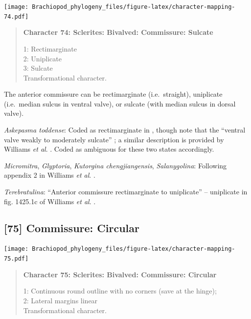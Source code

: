 \documentclass[openany]{book}
\begin{document}
\texttt{[image: Brachiopod\_phylogeny\_files/figure-latex/character-mapping-74.pdf]}

\begin{quote}
\textbf{Character 74: Sclerites: Bivalved: Commissure: Sulcate}

1: Rectimarginate\\
2: Uniplicate\\
3: Sulcate\\
Transformational character.
\end{quote}

The anterior commissure can be rectimarginate (i.e.~straight),
uniplicate (i.e.~median sulcus in ventral valve), or sulcate (with
median sulcus in dorsal valve).

\hypertarget{Askepasma_toddense-coding-74}{}
\emph{Askepasma toddense}: Coded as rectimarginate in
\citet{Williams1998Thediversity}, though note that the ``ventral valve
weakly to moderately sulcate'' \citep{Topper2013Theoldest}; a similar
description is provided by Williams \emph{et al}.
\citeyearpar{Williams2000LinguliformeaCraniiformea}. Coded as ambiguous
for these two states accordingly.

\hypertarget{Glyptoria-coding-74}{}
\emph{Micromitra}, \emph{Glyptoria}, \emph{Kutorgina chengjiangensis},
\emph{Salanygolina}: Following appendix 2 in Williams \emph{et al}.
\citeyearpar{Williams1998Thediversity}.

\hypertarget{Terebratulina-coding-74}{}
\emph{Terebratulina}: ``Anterior commissure rectimarginate to
uniplicate'' -- uniplicate in fig. 1425.1c of Williams \emph{et al}.
\citeyearpar{Williams2006Rhynchonelliformeapart}.

\subsection*{{[}75{]} Commissure: Circular}\label{commissure-circular}

\texttt{[image: Brachiopod\_phylogeny\_files/figure-latex/character-mapping-75.pdf]}

\begin{quote}
\textbf{Character 75: Sclerites: Bivalved: Commissure: Circular}

1: Continuous round outline with no corners (save at the hinge);\\
2: Lateral margins linear\\
Transformational character.
\end{quote}
\end{document}
